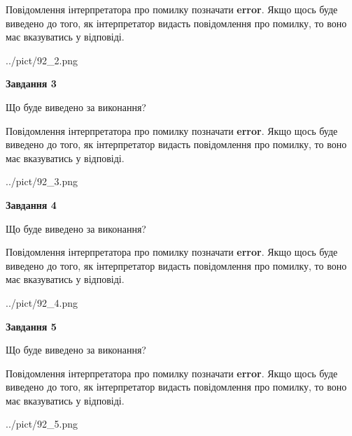 \documentclass[12pt, ukrainian]{article}
\begin{document}
{\begin {large}
Повідомлення інтерпретатора про помилку позначати \textbf{error}.
Якщо щось буде виведено до того, як інтерпретатор видасть повідомлення про помилку, 
то воно має вказуватись у відповіді. \par


\begin{center}
	{../pict/92_2.png}
\end{center}
\newpage

{\begin {center}\textbf{Завдання 3}\end {center}}\par
Що буде виведено за виконання?

Повідомлення інтерпретатора про помилку позначати \textbf{error}.
Якщо щось буде виведено до того, як інтерпретатор видасть повідомлення про помилку, 
то воно має вказуватись у відповіді. \par


\begin{center}
	{../pict/92_3.png}
\end{center}
\newpage

{\begin {center}\textbf{Завдання 4}\end {center}}\par
Що буде виведено за виконання?

Повідомлення інтерпретатора про помилку позначати \textbf{error}.
Якщо щось буде виведено до того, як інтерпретатор видасть повідомлення про помилку, 
то воно має вказуватись у відповіді. \par


\begin{center}
	{../pict/92_4.png}
\end{center}
\newpage

{\begin {center}\textbf{Завдання 5}\end {center}}\par
Що буде виведено за виконання?

Повідомлення інтерпретатора про помилку позначати \textbf{error}.
Якщо щось буде виведено до того, як інтерпретатор видасть повідомлення про помилку, 
то воно має вказуватись у відповіді. \par


\begin{center}
	{../pict/92_5.png}
\end{center}
\newpage


\end{large}}
\end{document}
